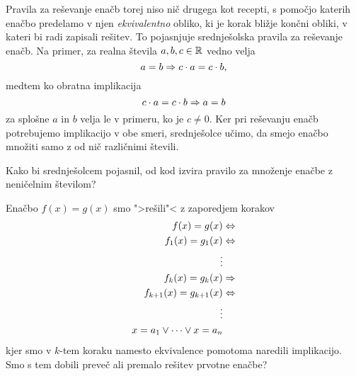 Pravila za reševanje enačb torej niso nič drugega kot recepti, s
pomočjo katerih enačbo predelamo v njen \emph{ekvivalentno} obliko, ki
je korak bližje končni obliki, v kateri bi radi zapisali rešitev. To
pojasnjuje srednješolska pravila za reševanje enačb. Na primer, za
realna števila $a, b, c \in \mathbb{R}$ vedno velja
%
\begin{equation*}
  a = b \Rightarrow c \cdot a = c \cdot b,
\end{equation*}
%
medtem ko obratna implikacija
%
\begin{equation*}
  c \cdot a = c \cdot b \Rightarrow a = b
\end{equation*}
%
za splošne $a$ in $b$ velja le v primeru, ko je $c \neq 0$. Ker pri
reševanju enačb potrebujemo implikacijo v obe smeri, srednješolce
učimo, da smejo enačbo množiti samo z od nič različnimi števili.

\begin{naloga}
  Kako bi srednješolcem pojasnil, od kod izvira pravilo za množenje
  enačbe z neničelnim številom?
\end{naloga}

\begin{naloga}
  Enačbo $f(x) = g(x)$ smo ">rešili"< z zaporedjem korakov
  \begin{align*}
    f(x) = g(x) &\Leftrightarrow \\
    f_1(x) = g_1(x) &\Leftrightarrow \\
    \vdots & \\
    f_k(x) = g_k(x) &\Rightarrow \\
    f_{k+1}(x) = g_{k+1}(x) &\Leftrightarrow \\
    \vdots & \\
    x = a_1 \lor \cdots \lor x = a_n
  \end{align*}
  kjer smo v $k$-tem koraku namesto ekvivalence pomotoma naredili
  implikacijo. Smo s tem dobili preveč ali premalo rešitev prvotne
  enačbe?
\end{naloga}



